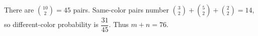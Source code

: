 There are $\binom{10}2=45$ pairs. Same-color pairs number $\binom32+\binom52+\binom22=14$, so different-color probability is $\dfrac{31}{45}$. Thus $m+n=\boxed{76}$.
